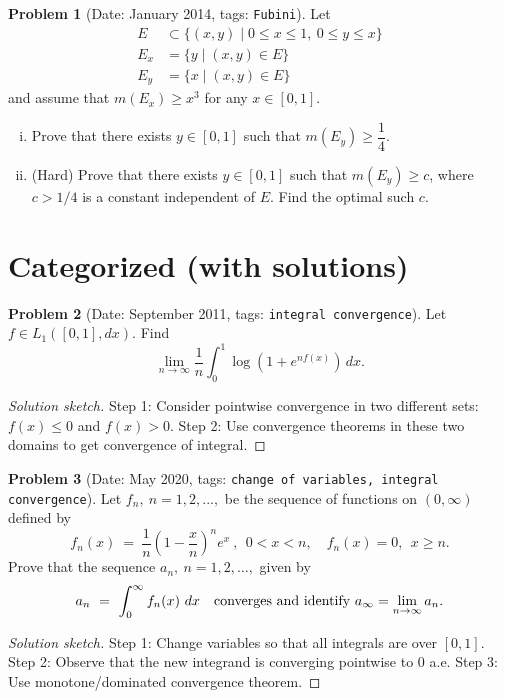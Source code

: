 \documentclass[11pt, notitlepage]{article}
\theoremstyle{definition}
\theoremstyle{definition}
\theoremstyle{definition}
\newtheorem{probstate}{Problem}
\theoremstyle{remark}
\newenvironment{problem}[2]{
    \begin{probstate}[Date: #1, tags: \texttt{#2}]
}
{
  \end{probstate}
}
\newenvironment{sketch}{
    \begin{proof}[Solution sketch]
}
{
    \end{proof}
}
\begin{document}
\begin{problem}{January 2014}{Fubini}
Let
\begin{align*}
E &\subset \{(x,y) \mid 0 \le x \le 1, \ 0 \le y \le x\}\\
E_x &= \{y\mid (x,y)\in E\}\\
E_y &= \{x\mid (x,y)\in E\}
\end{align*}
and assume that $m(E_x) \ge x^3$ for any $x \in [0,1]$.
\begin{enumerate}[(i)]
 \item Prove that there exists $y \in [0,1]$ such that $m(E_y) \ge \dfrac{1}{4}$.
 \item (Hard) Prove that there exists $y \in [0,1]$ such that $m(E_y) \ge c$, where $c>1/4$ is a constant independent of $E$. Find the optimal such $c$.
\end{enumerate}
\end{problem}

\section{Categorized (with solutions)}

\begin{problem}{September 2011}{integral convergence}
Let $f \in L_1([0,1], dx)$. Find
 \[
   \lim_{n \to \infty} \frac{1}{n}  \int_0^1 \log \left( 1+ e^{nf(x)} \right) \, dx.
 \]
\end{problem}
\begin{sketch}
Step 1: Consider pointwise convergence in two different sets: $f(x) \leq 0$ and $f(x) > 0$.
Step 2: Use convergence theorems in these two domains to get convergence of integral.
\end{sketch}

\begin{problem}{May 2020}{change of variables, integral convergence}
  Let $f_n, \ n=1,2,...,$ be the sequence of functions on $(0,\infty)$ defined by
$$
f_n(x) \ = \ \frac{1}{n}\left(1-\frac{x}{n}\right)^n e^{x} \ ,  \ \ 0<x<n, \quad f_n(x)=0, \ \ x\ge n.
$$
Prove that the sequence $a_n, \ n=1,2,\dots,$ given by
$$
a_n \ = \ \int_0^\infty f_n(x) \ dx \quad {\rm converges \ and \ identify \ } a_\infty=\lim_{n\to\infty} a_n.
$$
\end{problem}

\begin{sketch}
Step 1: Change variables so that all integrals are over $[0,1]$.
Step 2: Observe that the new integrand is converging pointwise to $0$ a.e.
Step 3: Use monotone/dominated convergence theorem.
\end{sketch}
\end{document}
